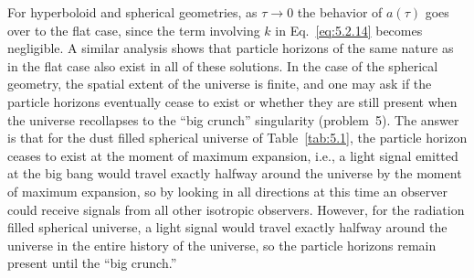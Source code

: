

For hyperboloid and spherical geometries, as \(\tau\to0\) the behavior of
\(a(\tau)\) goes over to the flat case, since the term involving \(k\) in
Eq.~\eqref{eq:5.2.14} becomes negligible. A similar analysis shows that particle
horizons of the same nature as in the flat case also exist in all of these solutions. In
the case of the spherical geometry, the spatial extent of the universe is finite, and one
may ask if the particle horizons eventually cease to exist or whether they are still
present when the universe recollapses to the ``big crunch'' singularity (problem~5).
The answer is that for the dust filled spherical universe of Table~\ref{tab:5.1}, the
particle horizon ceases to exist at the moment of maximum expansion, i.e., a light
signal emitted at the big bang would travel exactly halfway around the universe by the
moment of maximum expansion, so by looking in all directions at this time an observer
could receive signals from all other isotropic observers. However, for the radiation
filled spherical universe, a light signal would travel exactly halfway around the
universe in the entire history of the universe, so the particle horizons remain present
until the ``big crunch.''

